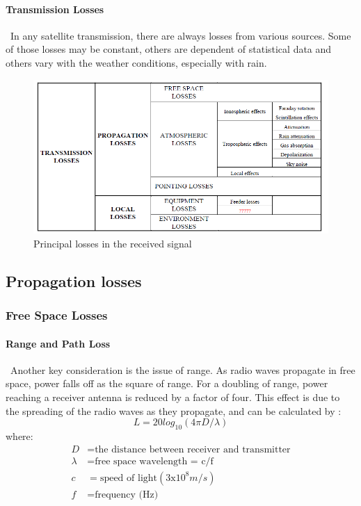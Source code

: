 \paragraph{Transmission Losses}
\ In any satellite transmission, there are always losses from various sources. Some of
those losses may be constant, others are dependent of statistical data and others vary
with the weather conditions, especially with rain.

\begin{figure}[h]
	\includegraphics[scale=0.8]{./sections/SatelliteDept/sections/images/principal_losses}
	\centering
	\caption{Principal losses in the received signal \cite{Jorge2012}}
	\label{principal_losses}
\end{figure}

\subsection{Propagation losses}
\subsubsection{Free Space Losses}
\paragraph{Range and Path Loss}
\
Another key consideration is the issue of range. As radio waves propagate in free space, power falls off as the square of range. For a doubling of range, power reaching a receiver antenna is reduced by a factor of four. This effect is due to the spreading of the radio waves as they propagate, and can be calculated by \cite{Note1998}:
\begin{equation}
L=20log_{10}(4\pi D/\lambda)
\label{FSP}
\end{equation}
where:
\begin{align*}
	D&= \text{the distance between receiver and transmitter}\\
	\lambda&= \text{free space wavelength = c/f}\\
	c&= \text{speed of light}(3\mathrm{x}10^8m/s)\\
	f&= \text{frequency (Hz)}
\end{align*}
\clearpage
